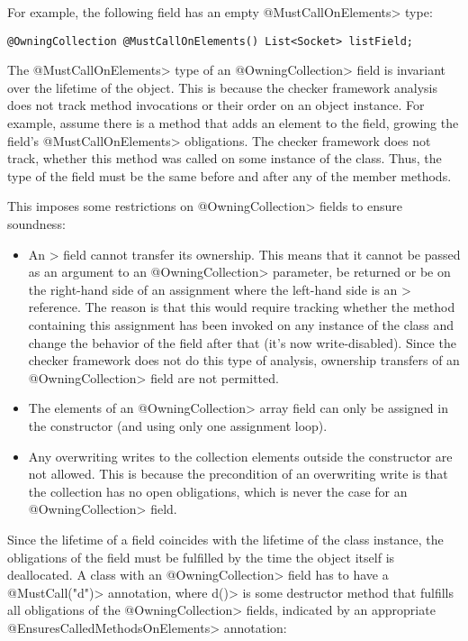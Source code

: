 For example, the following field has an empty \<@MustCallOnElements> type:

\begin{verbatim}
@OwningCollection @MustCallOnElements() List<Socket> listField;
\end{verbatim}

The \<@MustCallOnElements> type of an \<@OwningCollection> field is invariant over the lifetime of the object. This is because the checker framework analysis does not track method invocations or their order on an object instance. For example, assume there is a method that adds an element to the field, growing the field's \<@MustCallOnElements> obligations. The checker framework does not track, whether this method was called on some instance of the class. Thus, the type of the field must be the same before and after any of the member methods.

This imposes some restrictions on \<@OwningCollection> fields to ensure soundness:

\begin{itemize}
  \item An \@OwningCollection> field cannot transfer its ownership. This means that it cannot be passed as an argument to an \<@OwningCollection> parameter, be returned or be on the right-hand side of an assignment where the left-hand side is an \@OwningCollection> reference. The reason is that this would require tracking whether the method containing this assignment has been invoked on any instance of the class and change the behavior of the field after that (it's now write-disabled). Since the checker framework does not do this type of analysis, ownership transfers of an \<@OwningCollection> field are not permitted.
  \item The elements of an \<@OwningCollection> array field can only be assigned in the constructor (and using only one assignment loop).
  \item Any overwriting writes to the collection elements outside the constructor are not allowed. This is because the precondition of an overwriting write is that the collection has no open obligations, which is never the case for an \<@OwningCollection> field.
\end{itemize}

Since the lifetime of a field coincides with the lifetime of the class instance, the obligations of the field must be fulfilled by the time the object itself is deallocated.
A class with an \<@OwningCollection> field has to have a \<@MustCall("d")> annotation, where \<d()> is some destructor method that fulfills all obligations of the \<@OwningCollection> fields, indicated by an appropriate \<@EnsuresCalledMethodsOnElements> annotation:

